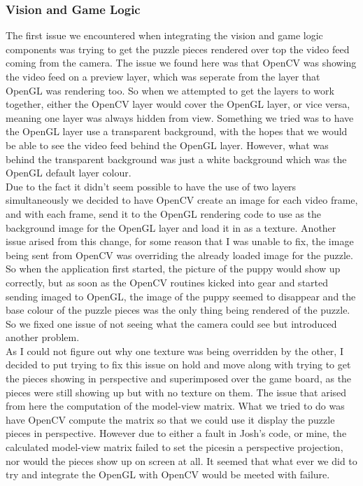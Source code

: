 \documentclass{article}
\begin{document}
\subsubsection{Vision and Game Logic}
The first issue we encountered when integrating the vision and game logic
components was trying to get the puzzle pieces rendered over top the video feed
coming from the camera. The issue we found here was that OpenCV was showing the
video feed on a preview layer, which was seperate from the layer that OpenGL was
rendering too. So when we attempted to get the layers to work together, either
the OpenCV layer would cover the OpenGL layer, or vice versa, meaning one layer
was always hidden from view. Something we tried was to have the OpenGL layer use
a transparent background, with the hopes that we would be able to see the video
feed behind the OpenGL layer. However, what was behind the transparent
background was just a white background which was the OpenGL default layer
colour.\\

Due to the fact it didn't seem possible to have the use of two layers
simultaneously we decided to have OpenCV create an image for each video frame,
and with each frame, send it to the OpenGL rendering code to use as the
background image for the OpenGL layer and load it in as a texture. Another issue
arised from this change, for some reason that I was unable to fix, the image
being sent from OpenCV was overriding the already loaded image for the
puzzle. So when the application first started, the picture of the puppy would
show up correctly, but as soon as the OpenCV routines kicked into gear and
started sending imaged to OpenGL, the image of the puppy seemed to disappear and
the base colour of the puzzle pieces was the only thing being rendered of the
puzzle. So we fixed one issue of not seeing what the camera could see but
introduced another problem.\\

As I could not figure out why one texture was being overridden by the other, I
decided to put trying to fix this issue on hold and move along with trying to
get the pieces showing in perspective and superimposed over the game board, as
the pieces were still showing up but with no texture on them. The issue that
arised from here the computation of the model-view matrix. What we tried to do
was have OpenCV compute the matrix so that we could use it display the puzzle
pieces in perspective. However due to either a fault in Josh's code, or mine,
the calculated model-view matrix failed to set the picesin a perspective
projection, nor would the pieces show up on screen at all. It seemed that what
ever we did to try and integrate the OpenGL with OpenCV would be meeted with
failure.\\
\end{document}
